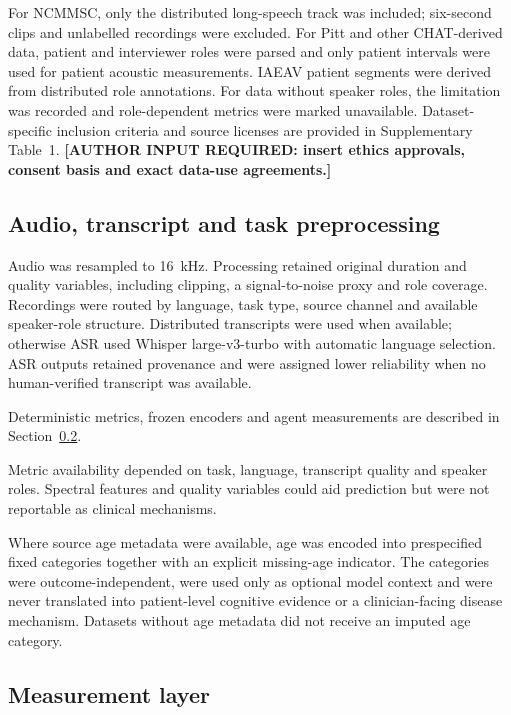 \documentclass[pdflatex,sn-nature]{sn-jnl}
\begin{document}
For NCMMSC, only the distributed long-speech track was included; six-second clips and unlabelled recordings were excluded. For Pitt and other CHAT-derived data, patient and interviewer roles were parsed and only patient intervals were used for patient acoustic measurements. IAEAV patient segments were derived from distributed role annotations. For data without speaker roles, the limitation was recorded and role-dependent metrics were marked unavailable. Dataset-specific inclusion criteria and source licenses are provided in Supplementary Table~1. \textbf{[AUTHOR INPUT REQUIRED: insert ethics approvals, consent basis and exact data-use agreements.]}

\subsection{Audio, transcript and task preprocessing}

Audio was resampled to 16~kHz. Processing retained original duration and quality variables, including clipping, a signal-to-noise proxy and role coverage. Recordings were routed by language, task type, source channel and available speaker-role structure. Distributed transcripts were used when available; otherwise ASR used Whisper large-v3-turbo with automatic language selection. ASR outputs retained provenance and were assigned lower reliability when no human-verified transcript was available.

Deterministic metrics, frozen encoders and agent measurements are described in Section~\ref{sec:m-measure}.

Metric availability depended on task, language, transcript quality and speaker roles. Spectral features and quality variables could aid prediction but were not reportable as clinical mechanisms.

Where source age metadata were available, age was encoded into prespecified fixed categories together with an explicit missing-age indicator. The categories were outcome-independent, were used only as optional model context and were never translated into patient-level cognitive evidence or a clinician-facing disease mechanism. Datasets without age metadata did not receive an imputed age category.

\subsection{Measurement layer}\label{sec:m-measure}
\end{document}
